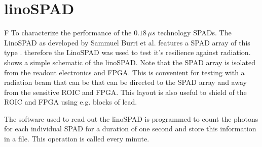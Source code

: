\section{linoSPAD}\label{ssec:linoSPAD}
F
To characterize the performance of the $0.18\,\mu s$ technology SPADs. The LinoSPAD as developed by Sammuel Burri et al. features a SPAD array of this type \cite{burri2016linospad}. therefore the LinoSPAD was used to test it's resilience against radiation.  shows a simple schematic of the linoSPAD. Note that the SPAD array is isolated from the readout electronics and FPGA. This is convenient for testing with a radiation beam that can be that can be directed to the SPAD array and away from the sensitive ROIC and FPGA. This layout is also useful to shield of the ROIC and FPGA using e.g. blocks of lead.



The software used to read out the linoSPAD is programmed to count the photons for each individual SPAD for a duration of one second and store this information in a file. This operation is called every minute.
